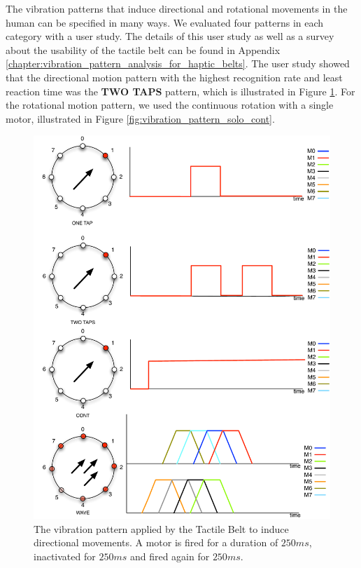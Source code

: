The vibration patterns that induce directional and rotational movements in the human can be specified in many ways. We evaluated four patterns in each category with a user study. The details of this user study as well as a survey about the usability of the tactile belt can be found in Appendix \ref{chapter:vibration_pattern_analysis_for_haptic_belts}. The user study showed that the directional motion pattern with the highest recognition rate and least reaction time was the \textbf{TWO TAPS} pattern, which is illustrated in Figure \ref{fig:vibration_pattern_two_taps}. For the rotational motion pattern, we used the continuous rotation with a single motor, illustrated in Figure \ref{fig:vibration_pattern_solo_cont}. 

\begin{figure}[ht!]
\centering
\includegraphics[width=1.0\textwidth]{pics/vibration_pattern_two_taps}
\caption{The vibration pattern applied by the Tactile Belt to induce directional movements. A motor is fired for a duration of $250ms$, inactivated for $250ms$ and fired again for $250ms$.}
\label{fig:vibration_pattern_two_taps}
\end{figure}

